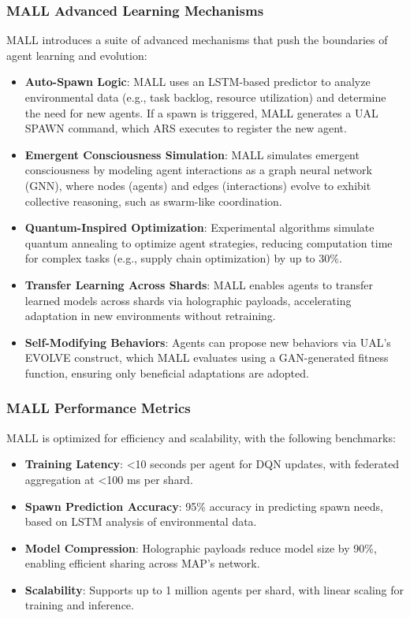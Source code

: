 \documentclass[a4paper,11pt]{article}
\begin{document}
\subsubsection{MALL Advanced Learning Mechanisms}
MALL introduces a suite of advanced mechanisms that push the boundaries of agent learning and evolution:
\begin{itemize}[leftmargin=*]
    \item \textbf{Auto-Spawn Logic}: MALL uses an LSTM-based predictor to analyze environmental data (e.g., task backlog, resource utilization) and determine the need for new agents. If a spawn is triggered, MALL generates a UAL SPAWN command, which ARS executes to register the new agent.
    \item \textbf{Emergent Consciousness Simulation}: MALL simulates emergent consciousness by modeling agent interactions as a graph neural network (GNN), where nodes (agents) and edges (interactions) evolve to exhibit collective reasoning, such as swarm-like coordination.
    \item \textbf{Quantum-Inspired Optimization}: Experimental algorithms simulate quantum annealing to optimize agent strategies, reducing computation time for complex tasks (e.g., supply chain optimization) by up to 30\%.
    \item \textbf{Transfer Learning Across Shards}: MALL enables agents to transfer learned models across shards via holographic payloads, accelerating adaptation in new environments without retraining.
    \item \textbf{Self-Modifying Behaviors}: Agents can propose new behaviors via UAL’s EVOLVE construct, which MALL evaluates using a GAN-generated fitness function, ensuring only beneficial adaptations are adopted.
\end{itemize}

\subsubsection{MALL Performance Metrics}
MALL is optimized for efficiency and scalability, with the following benchmarks:
\begin{itemize}[leftmargin=*]
    \item \textbf{Training Latency}: <10 seconds per agent for DQN updates, with federated aggregation at <100 ms per shard.
    \item \textbf{Spawn Prediction Accuracy}: 95\% accuracy in predicting spawn needs, based on LSTM analysis of environmental data.
    \item \textbf{Model Compression}: Holographic payloads reduce model size by 90\%, enabling efficient sharing across MAP’s network.
    \item \textbf{Scalability}: Supports up to 1 million agents per shard, with linear scaling for training and inference.
\end{itemize}
\end{document}
